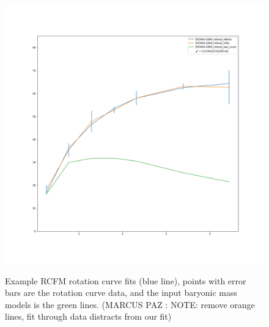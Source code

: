 \documentclass[reprint,%
 amsmath,amssymb,
 aps,
]{revtex4-1}
\begin{document}
\begin{figure}
\begin{minipage}{.5\textwidth}
  \label{fig:test1}
\end{minipage}%
\begin{minipage}{.5\textwidth}
  \centering
  \includegraphics[width=.95\linewidth]{figures/ESO444-G084_rotmod_XueSofue.png}
  \label{fig:test1}
\end{minipage}
 \caption{Example  RCFM rotation curve fits (blue line), points with error bars are the rotation curve data, and the input baryonic mass models is  the green lines. (MARCUS PAZ : NOTE: remove orange lines, fit through data distracts from our fit)  }
\end{figure}
\end{document}
